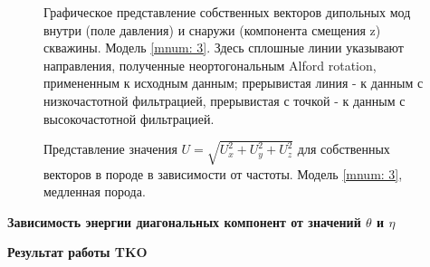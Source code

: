 \begin{figure}[h]
\begin{minipage}{0.24\linewidth}
\end{minipage}
\hfill
\begin{minipage}{0.24\linewidth}
\end{minipage}
\begin{minipage}{0.24\linewidth}
\end{minipage}
\begin{minipage}{0.24\linewidth}
\end{minipage}
\begin{minipage}{0.24\linewidth}
\end{minipage}
\hfill

\caption{Графическое представление собственных векторов дипольных мод внутри (поле давления) и снаружи (компонента смещения z) скважины. Модель \ref{mnum: 3}. Здесь сплошные линии указывают направления, полученные неортогональным Alford rotation, примененным к исходным данным; прерывистая линия - к данным с низкочастотной фильтрацией, прерывистая с точкой - к данным с высокочастотной фильтрацией.}
\end{figure}

\begin{figure}[h]
\centering
	\caption{Представление значения $U = \sqrt{U_x^2+U_y^2+U_z^2}$ для собственных векторов в породе в зависимости от частоты. Модель \ref{mnum: 3}, медленная порода. }		
\end{figure}

\textbf{Зависимость энергии диагональных компонент от значений $\theta$ и $\eta$}\\
			\label{fig:rot4_gs_solution}

\begin{minipage}[h]{0.47\linewidth}
\begin{center}
\textbf{Результат работы TKO}
			\\
	  		\label{fig:rot4_tko_comp}
\end{center}	  		
\end{minipage}

